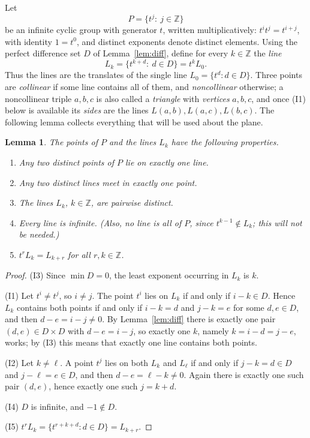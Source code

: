 \documentclass[12pt]{article}
\theoremstyle{plain}
\newtheorem{lemma}[theorem]{Lemma}
\theoremstyle{definition}
\newcommand{\Z}{\mathbb{Z}}
\begin{document}
Let
\[
 P=\{t^j:\ j\in\Z\}
\]
be an infinite cyclic group with generator $t$, written
multiplicatively: $t^it^j=t^{i+j}$, with identity $1=t^0$, and distinct
exponents denote distinct elements.  Using the perfect difference set
$D$ of Lemma~\ref{lem:diff}, define for every $k\in\Z$ the \emph{line}
\[
 L_k=\{t^{k+d}:\ d\in D\}=t^k L_0 .
\]
Thus the lines are the translates of the single line $L_0=\{t^d:d\in D\}$.
Three points are \emph{collinear} if some line contains all of them, and
\emph{noncollinear} otherwise; a noncollinear triple $a,b,c$ is also
called a \emph{triangle} with \emph{vertices} $a,b,c$, and once (I1)
below is available its \emph{sides} are the lines
$L(a,b),L(a,c),L(b,c)$.  The following lemma collects everything that
will be used about the plane.

\begin{lemma}\label{lem:incidence}
The points of $P$ and the lines $L_k$ have the following properties.
\begin{enumerate}
\item[(I1)] Any two distinct points of $P$ lie on exactly one line.
\item[(I2)] Any two distinct lines meet in exactly one point.
\item[(I3)] The lines $L_k$, $k\in\Z$, are pairwise distinct.
\item[(I4)] Every line is infinite.  (Also, no line is all of $P$, since
$t^{k-1}\notin L_k$; this will not be needed.)
\item[(I5)] $t^rL_k=L_{k+r}$ for all $r,k\in\Z$.
\end{enumerate}
\end{lemma}
\begin{proof}
(I3) Since $\min D=0$, the least exponent occurring in $L_k$ is $k$.

(I1) Let $t^i\neq t^j$, so $i\neq j$.  The point $t^i$ lies on $L_k$ if
and only if $i-k\in D$.  Hence $L_k$ contains both points if and only if
$i-k=d$ and $j-k=e$ for some $d,e\in D$, and then $d-e=i-j\neq0$.  By
Lemma~\ref{lem:diff} there is exactly one pair $(d,e)\in D\times D$ with
$d-e=i-j$, so exactly one $k$, namely $k=i-d=j-e$, works; by (I3) this
means that exactly one line contains both points.

(I2) Let $k\neq\ell$.  A point $t^j$ lies on both $L_k$ and $L_\ell$ if
and only if $j-k=d\in D$ and $j-\ell=e\in D$, and then
$d-e=\ell-k\neq0$.  Again there is exactly one such pair $(d,e)$, hence
exactly one such $j=k+d$.

(I4) $D$ is infinite, and $-1\notin D$.

(I5) $t^r L_k=\{t^{r+k+d}:d\in D\}=L_{k+r}$.
\end{proof}
\end{document}
